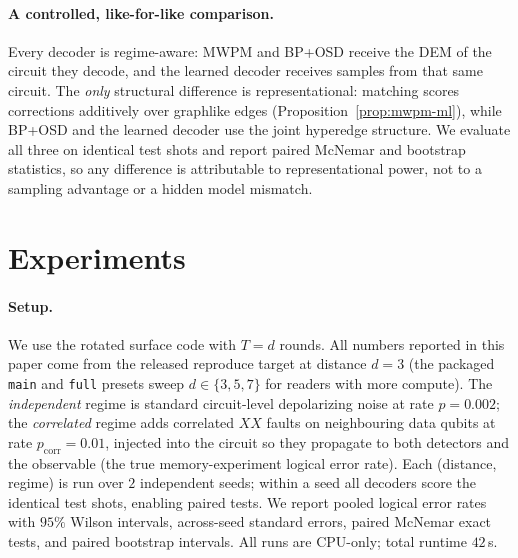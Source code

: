 \documentclass[aps,prxquantum,twocolumn,superscriptaddress,nofootinbib,longbibliography]{revtex4-2}
\newcommand{\res}[1]{#1}
\begin{document}
\paragraph{A controlled, like-for-like comparison.}
Every decoder is regime-aware: MWPM and BP+OSD receive the DEM of the circuit they
decode, and the learned decoder receives samples from that same circuit. The
\emph{only} structural difference is representational: matching scores corrections
additively over graphlike edges (Proposition~\ref{prop:mwpm-ml}), while BP+OSD and
the learned decoder use the joint hyperedge structure. We evaluate all three on
identical test shots and report paired McNemar and bootstrap statistics, so any
difference is attributable to representational power, not to a sampling advantage
or a hidden model mismatch.

\section{Experiments}
\label{sec:results}

\paragraph{Setup.}
We use the rotated surface code with $T=d$ rounds. All numbers reported in this
paper come from the released reproduce target at distance $d=3$ (the packaged
\texttt{main} and \texttt{full} presets sweep $d\in\{3,5,7\}$ for readers with
more compute). The \emph{independent} regime is standard circuit-level
depolarizing noise at rate
$p=\res{0.002}$; the \emph{correlated} regime adds correlated $XX$ faults on
neighbouring data qubits at rate $p_{\mathrm{corr}}=\res{0.01}$, injected
into the circuit so they propagate to both detectors and the observable (the true
memory-experiment logical error rate). Each (distance, regime) is run over
$\res{2}$ independent seeds; within a seed all decoders score the
identical test shots, enabling paired tests. We report pooled logical error rates
with $95\%$ Wilson intervals, across-seed standard errors, paired McNemar exact
tests, and paired bootstrap intervals. All runs are CPU-only; total runtime
$\res{42}$\,s.

\begin{table}[t]
\centering
\caption{Head-to-head logical error rate, pooled over seeds on identical shots.
Each entry is the pooled logical error rate with its $95\%$ Wilson interval; the
last column is the relative error reduction of the GNN versus MWPM with the paired
McNemar $p$-value. Under independent noise MWPM is provably maximum-likelihood
(Proposition~\ref{prop:mwpm-ml}) and the compact GNN concedes a finite-sample
penalty there, reported as measured; under correlated noise the GNN beats MWPM
and approaches BP+OSD. Values are generated verbatim from
\texttt{summary.json}.}
\label{tab:main}

\end{table}
\end{document}
